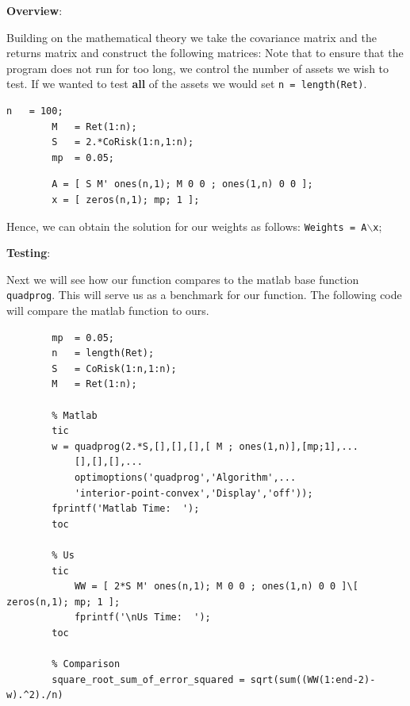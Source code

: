\documentclass[12pt,titlepage,letter]{article}
\begin{document}
	\begin{par}
		\textbf{Overview}:
	\end{par} \vspace{1em}
	\begin{par}
		Building on the mathematical theory we take the covariance matrix and the returns matrix and construct the following matrices: Note that to ensure that the program does not run for too long, we control the number of assets we wish to test. If we wanted to test \textbf{all} of the assets we would set \texttt{n = length(Ret)}.
	\end{par} \vspace{1em}
	\begin{lstlisting}n   = 100;
		M   = Ret(1:n);
		S   = 2.*CoRisk(1:n,1:n);
		mp  = 0.05;
	\end{lstlisting}
	\begin{lstlisting}
		A = [ S M' ones(n,1); M 0 0 ; ones(1,n) 0 0 ];
		x = [ zeros(n,1); mp; 1 ];
	\end{lstlisting}
	\begin{par}
		Hence, we can obtain the solution for our weights as follows: \texttt{Weights = A\ensuremath{\backslash}x};
	\end{par} \vspace{1em}
	\begin{par}
		\textbf{Testing}:
	\end{par} \vspace{1em}
	\begin{par}
		Next we will see how our function compares to the matlab base function \texttt{quadprog}. This will serve us as a benchmark for our function. The following code will compare the matlab function to ours.
	\end{par} \vspace{1em}
	\begin{lstlisting}
		mp  = 0.05;
		n   = length(Ret);
		S   = CoRisk(1:n,1:n);
		M   = Ret(1:n);

		% Matlab
		tic
	    w = quadprog(2.*S,[],[],[],[ M ; ones(1,n)],[mp;1],...
            [],[],[],...
            optimoptions('quadprog','Algorithm',...
            'interior-point-convex','Display','off'));
	    fprintf('Matlab Time:  ');
		toc

		% Us
		tic
		    WW = [ 2*S M' ones(n,1); M 0 0 ; ones(1,n) 0 0 ]\[ zeros(n,1); mp; 1 ];
		    fprintf('\nUs Time:  ');
		toc

		% Comparison
		square_root_sum_of_error_squared = sqrt(sum((WW(1:end-2)-w).^2)./n)
	\end{lstlisting}
\end{document}
